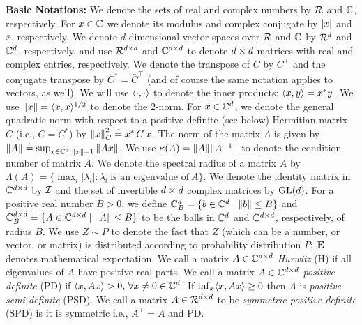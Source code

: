 \textbf{Basic Notations:} We denote the sets of real and complex numbers by $\mathcal{R}$ and $\mathbb{C}$, respectively. For $x\in \mathbb{C}$ we denote its modulus and complex conjugate by $\left|x\right|$ and $\bar{x}$, respectively. We denote $d$-dimensional vector spaces over $\mathcal{R}$ and $\mathbb{C}$ by $\mathcal{R}^{d}$ and $\mathbb{C}^{d}$, respectively, and use $\mathcal{R}^{d \times d}$ and $\mathbb{C}^{d \times d}$ to denote $d \times d$ matrices with real and complex entries, respectively. We denote the transpose of $C$ by $C^\top$ and the conjugate transpose by $C^*={\bar{C}}^\top$ (and of course the same notation applies to vectors, as well). We will use $\langle\cdot,\cdot\rangle$ to denote the inner products: $\langle x,y\rangle=x^* y$. 
We use $\left\| x\right\| = \langle x,x\rangle^{1/2}$ to denote the $2$-norm.
For $x\in\mathbb{C}^d$, we denote the general quadratic norm with respect to a positive definite (see below) Hermitian matrix $C$ (i.e., $C=C^*$) by $\left\| x\right\|^2_C\stackrel{\cdot}{=} x^*\, C \,x$.
The norm of the matrix $A$ is given by $\left\| A\right\|\stackrel{\cdot}{=} \sup_{x\in \mathbb{C}^d:\left\| x\right\|=1} \left\| Ax\right\|$.  We use $\kappa(A)=\| A\|\| A^{-1}\|$ to denote the condition number of matrix $A$. We denote the spectral radius of a matrix $A$ by $\Lambda(A)=\{\max_i \left|\lambda_i\right|: \lambda_i ~\text{is an eigenvalue of}~A\}$.
We denote the identity matrix in $\mathbb{C}^{d \times d}$ by $\mathcal{I}$ and the set of invertible $d \times d$ complex matrices by $\mathrm{GL}(d)$.
For a positive real number $B>0$, we define $\mathbb{C}^{d}_B=\{b\in \mathbb{C}^d\mid \left\| b\right\|\leq B\}$ and $\mathbb{C}^{d \times d}_B=\{A\in \mathbb{C}^{d \times d}\mid \left\| A\right\|\leq B\}$ to be the balls in $\mathbb{C}^d$ and $\mathbb{C}^{d\times d}$, respectively, of radius $B$. We use $Z\sim P$ to denote the fact that $Z$ (which can be a number, or vector, or matrix) is distributed according to probability distribution $P$; $\mathbf{E}$ denotes mathematical expectation. We call a matrix $A\in \mathbb{C}^{d \times d}$  \emph{Hurwitz} (H) if all eigenvalues of $A$ have positive real parts. We call a matrix $A\in \mathbb{C}^{d \times d}$ \emph{positive definite} (PD) if $\langle x,Ax\rangle >0,\,\forall x\neq 0 \in \mathbb{C}^{d}$.  
If $\inf_x \langle x,Ax\rangle\ge 0$ then $A$ is \emph{positive semi-definite} (PSD).
We call a matrix $A\in \mathcal{R}^{d \times d}$ to be \emph{symmetric positive definite} (SPD) is it is symmetric i.e., $A^\top=A$ and PD. 
